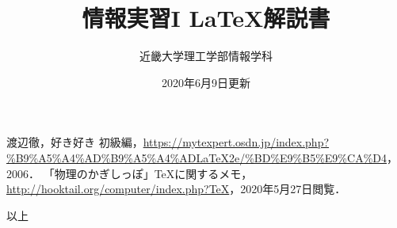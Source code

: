 \documentclass[a4j]{jsarticle}
\begin{document}
\title{情報実習I \LaTeX 解説書}
\date{2020年6月9日更新}
\author{近畿大学理工学部情報学科}

\maketitle








\begin{thebibliography}{1}
    渡辺徹，好き好き \LaTeXe 初級編，\url{https://mytexpert.osdn.jp/index.php?%B9%A5%A4%AD%B9%A5%A4%ADLaTeX2e/%BD%E9%B5%E9%CA%D4}，2006．
    「物理のかぎしっぽ」\TeX に関するメモ，\url{http://hooktail.org/computer/index.php?TeX}，2020年5月27日閲覧．
\end{thebibliography}

\begin{flushright}
以上
\end{flushright}
\end{document}
